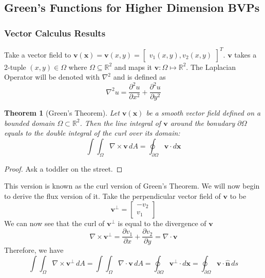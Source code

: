 \documentclass{article}
\newcommand{\R}{\mathbb{R}}
\newcommand{\pd}[2]{\frac{\partial #1}{\partial #2}}
\newcommand{\pdt}[2]{\frac{\partial ^2 #1}{\partial #2 ^2}}
\newcommand{\vb}[1]{\mathbf{ #1}}
\newcommand{\lap}{\nabla ^2}
\newcommand{\dive}[1]{\nabla \cdot \vb{#1}}
\newcommand{\curl}[1]{\nabla \times \vb{#1}}
\newcommand{\pull}{\! \! \!}
\newcommand{\un}{\mathbf{\hat{n}}}
\newtheorem{theorem}{Theorem}[section]
\numberwithin{equation}{section}
\begin{document}
\subsection{Green's Functions for Higher Dimension BVPs}
\subsubsection{Vector Calculus Results} 
Take a vector field to $\vb{v(x)}= \vb{v} (x,y) = \begin{bmatrix} v_1(x,y), v_2(x,y)  \end{bmatrix}^T$. $\vb{v}$ takes a 2-tuple $(x,y) \in \Omega$ where $\Omega \subseteq \R^2$ and maps it $\vb{v}:\Omega\mapsto\R^2$. The Laplacian Operator will be denoted with $\lap$ and is defined as
\begin{equation*}
    \lap u= \pdt{u}{x} + \pdt{u}{y}
\end{equation*}

\begin{theorem}[Green's Theorem]
    Let $\vb{v(x)}$ be a smooth vector field defined on a bounded domain $\Omega \subset\R^2$. Then the line integral of $\vb{v}$ around the bonudary $\partial \Omega$ equals to the double integral of the curl over its domain:
    \begin{equation}
        \int \pull \int_\Omega \curl{\vb{v}} \, dA = \oint_{\partial\Omega}\vb{v} \cdot d\vb{x} \label{eq:gt}
    \end{equation}  
\end{theorem}
\begin{proof}
    Ask a toddler on the street.
\end{proof}
This version is known as the curl version of Green's Theorem. We will now begin to derive the flux version of it. Take the perpendicular vector field of $\vb{v}$ to be 
\begin{equation*}
    \vb{v}^\perp = 
    \begin{bmatrix}
        -v_2 \\ v_1
    \end{bmatrix}
\end{equation*}
We can now see that the curl of $\vb{v}^\perp$ is equal to the divergence of $\vb{v}$
\begin{equation*}
    \curl{\vb{v}}^\perp = \pd{v_1}{x} + \pd{v_2}{y} = \dive{\vb{v}}
\end{equation*}
Therefore, we have 
\begin{equation}
    \int \pull \int_\Omega \curl{\vb{v^\perp}} \,dA = \int \pull\int_\Omega \dive{v} \,dA = \oint_{\partial\Omega}\vb{v}^\perp\cdot d\vb{x} = \oint_{\partial \Omega} \vb{v} \cdot \un \, ds \label{eq:gtf}
\end{equation} %
\end{document}
